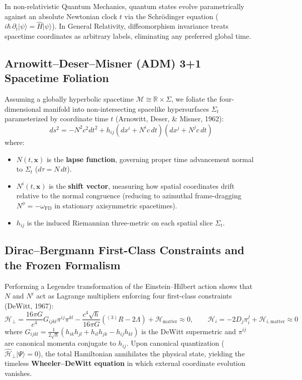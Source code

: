 \documentclass[11pt,a4paper]{article}
\begin{document}
In non-relativistic Quantum Mechanics, quantum states evolve parametrically against an absolute Newtonian clock $t$ via the Schr\"odinger equation ($i\hbar\,\partial_t \vert\psi\rangle = \hat{H}\vert\psi\rangle$). In General Relativity, diffeomorphism invariance treats spacetime coordinates as arbitrary labels, eliminating any preferred global time.

\subsection{Arnowitt--Deser--Misner (ADM) 3+1 Spacetime Foliation}

Assuming a globally hyperbolic spacetime $\mathcal{M} \cong \mathbb{R} \times \Sigma$, we foliate the four-dimensional manifold into non-intersecting spacelike hypersurfaces $\Sigma_t$ parameterized by coordinate time $t$ (Arnowitt, Deser, \& Misner, 1962):
\begin{equation}
ds^2 = -N^2 c^2 dt^2 + h_{ij}\left(dx^i + N^i c\,dt\right)\left(dx^j + N^j c\,dt\right)
\end{equation}
where:
\begin{itemize}
    \item $N(t, \mathbf{x})$ is the \textbf{lapse function}, governing proper time advancement normal to $\Sigma_t$ ($d\tau = N\,dt$).
    \item $N^i(t, \mathbf{x})$ is the \textbf{shift vector}, measuring how spatial coordinates drift relative to the normal congruence (reducing to azimuthal frame-dragging $N^\phi = -\omega_{\text{FD}}$ in stationary axisymmetric spacetimes).
    \item $h_{ij}$ is the induced Riemannian three-metric on each spatial slice $\Sigma_t$.
\end{itemize}

\subsection{Dirac--Bergmann First-Class Constraints and the Frozen Formalism}

Performing a Legendre transformation of the Einstein--Hilbert action shows that $N$ and $N^i$ act as Lagrange multipliers enforcing four first-class constraints (DeWitt, 1967):
\begin{equation}
\mathcal{H}_\perp = \frac{16\pi G}{c^4} G_{ijkl} \pi^{ij} \pi^{kl} - \frac{c^4 \sqrt{h}}{16\pi G}\left({}^{(3)}R - 2\Lambda\right) + \mathcal{H}_{\text{matter}} \approx 0, \qquad \mathcal{H}_i = -2 D_j \pi^j_i + \mathcal{H}_{i,\text{matter}} \approx 0
\end{equation}
where $G_{ijkl} = \frac{1}{2\sqrt{h}}(h_{ik}h_{jl} + h_{il}h_{jk} - h_{ij}h_{kl})$ is the DeWitt supermetric and $\pi^{ij}$ are canonical momenta conjugate to $h_{ij}$. Upon canonical quantization ($\hat{\mathcal{H}}_\perp \vert\Psi\rangle = 0$), the total Hamiltonian annihilates the physical state, yielding the timeless \textbf{Wheeler--DeWitt equation} in which external coordinate evolution vanishes.
\end{document}
